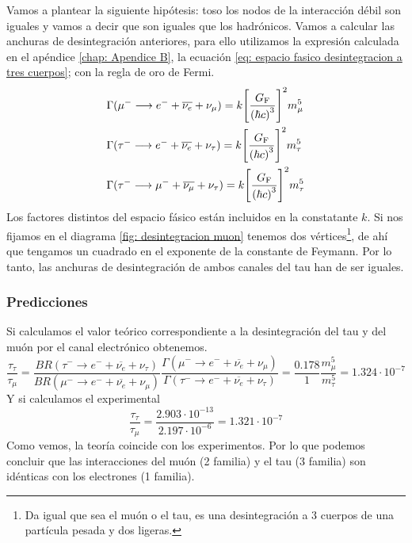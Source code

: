 Vamos a plantear la siguiente hipótesis: toso los nodos de la interacción débil son iguales y vamos a decir que son iguales que los hadrónicos. Vamos a calcular las anchuras de desintegración anteriores, para ello utilizamos la expresión calculada en el apéndice \ref{chap: Apendice B}, la ecuación \ref{eq: espacio fasico desintegracion a tres cuerpos}; con la regla de oro de Fermi. 
\begin{equation}
    \begin{aligned}
        & \Gamma(\mu^-\longrightarrow e^- +\overline{\nu_e}+ \nu_\mu)=k\qty[\dfrac{G_\mathrm{F}}{\qty(\hbar c)^3}]^2m_\mu^5\\
        &\Gamma(\tau^-\longrightarrow e^-+ \overline{\nu_e} +\nu_\tau)=k\qty[\dfrac{G_\mathrm{F}}{\qty(\hbar c)^3}]^2m_\tau^5\\
        &\Gamma(\tau^-\longrightarrow \mu^-+ \overline{\nu_\mu} +\nu_\tau)=k\qty[\dfrac{G_\mathrm{F}}{\qty(\hbar c)^3}]^2m_\tau^5
    \end{aligned}
\end{equation}
Los factores distintos del espacio fásico están incluidos en la constatante $k$. Si nos fijamos en el diagrama \ref{fig: desintegracion muon} tenemos dos vértices\footnote{Da igual que sea el muón o el tau, es una desintegración a 3 cuerpos de una partícula pesada y dos ligeras.}, de ahí que tengamos un cuadrado en el exponente de la constante de Feymann. Por lo tanto, las anchuras de desintegración de ambos canales del tau han de ser iguales.
\subsubsection{Predicciones}
Si calculamos el valor teórico correspondiente a la desintegración del tau y del muón por el canal electrónico obtenemos.
\begin{equation*}
    \frac{\tau_\tau}{\tau_\mu}=\frac{BR(\tau^-\xrightarrow{} e^-+ \overline{\nu_e} +\nu_\tau)}{BR(\mu^-\xrightarrow{} e^- +\overline{\nu_e}+ \nu_\mu)}\frac{\Gamma(\mu^-\xrightarrow{} e^- +\overline{\nu_e}+ \nu_\mu)}{\Gamma(\tau^-\xrightarrow{} e^-+ \overline{\nu_e} +\nu_\tau)}=\frac{0.178}{1}\frac{m_\mu^5}{m_\tau^5}=1.324\cdot10^{-7}
\end{equation*}
Y si calculamos el experimental
\begin{equation*}
    \frac{\tau_\tau}{\tau_\mu}= \frac{2.903\cdot 10^{-13}}{2.197\cdot 10^{-6}}=1.321\cdot 10^{-7}
\end{equation*}
Como vemos, la teoría coincide con los experimentos. Por lo que podemos concluir que las interacciones del muón (2 familia) y el tau (3 familia) son idénticas con los electrones (1 familia).

